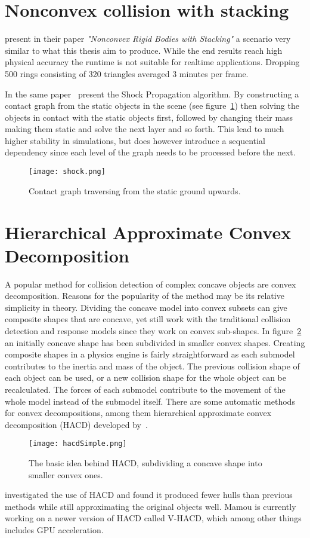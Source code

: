 \section{Nonconvex collision with stacking}
\cite{guendelman} present in their paper \textit{"Nonconvex Rigid Bodies with Stacking"}
a scenario very similar to what this thesis aim to produce.
While the end results reach high physical accuracy the runtime is not suitable for realtime applications.
 Dropping 500 rings consisting of 320 triangles averaged 3 minutes per frame.

In the same paper~\cite{guendelman} present the Shock Propagation algorithm.
By constructing a contact graph from the static objects in the scene (see figure~\ref{fig:cont})
then solving the objects in contact with the static objects first, followed by changing their
mass making them static and solve the next layer and so forth. This lead to much
higher stability in simulations, but does however introduce a sequential dependency
since each level of the graph needs to be processed before the next.

\begin{figure}[H]
  \centering
  \texttt{[image: shock.png]}
  \caption{Contact graph traversing from the static ground upwards.}
  \label{fig:cont}
\end{figure}

\section{Hierarchical Approximate Convex Decomposition}
A popular method for collision detection of complex concave objects
are convex decomposition. Reasons for the popularity of the method may be its relative
simplicity in theory. Dividing the concave model into convex subsets
can give composite shapes that are concave, yet still work with the
traditional collision detection and response models since they work on convex
sub-shapes. In figure~\ref{fig:hacdSimple} an initially concave shape has
been subdivided in smaller convex shapes. Creating composite shapes in a physics
engine is fairly straightforward as each submodel contributes to the inertia and
mass of the object. The previous collision shape of each object can be used, or a new collision
shape for the whole object can be recalculated. The forces of each submodel
contribute to the movement of the whole model instead of the submodel itself.
There are some automatic methods for convex decompositions, among them hierarchical
 approximate convex decomposition (HACD) developed by~\cite{mamou}.

\begin{figure}[H]
  \centering
  \texttt{[image: hacdSimple.png]}
  \caption{The basic idea behind HACD, subdividing a concave shape into smaller convex ones.}
  \label{fig:hacdSimple}
\end{figure}

\cite{HACD} investigated the use of HACD and found it produced fewer hulls
than previous methods while still approximating the original objects well.
Mamou is currently working on a newer version of HACD called
V-HACD, which among other things includes GPU acceleration.
